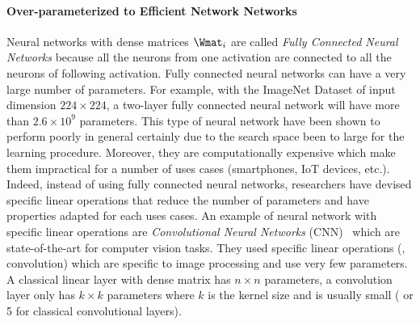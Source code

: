 \paragraph{Over-parameterized to Efficient Network Networks}
Neural networks with dense matrices $\Wmat_i$ are called \emph{Fully Connected Neural Networks} because all the neurons from one activation are connected to all the neurons of following activation.
Fully connected neural networks can have a very large number of parameters.
For example, with the ImageNet Dataset of input dimension $224 \times 224$, a two-layer fully connected neural network will have more than $2.6 \times 10^9$ parameters.
This type of neural network have been shown to perform poorly in general certainly due to the search space been to large for the learning procedure.
Moreover, they are computationally expensive which make them impractical for a number of uses cases (smartphones, IoT devices, etc.).
Indeed, instead of using fully connected neural networks, researchers have devised specific linear operations that reduce the number of parameters and have properties adapted for each uses cases. 
An example of neural network with specific linear operations are \emph{Convolutional Neural Networks} (CNN)~\cite{lecun1998gradient,krizhevsky2012imagenet,he2016deep,tan2019efficientnet} which are state-of-the-art for computer vision tasks. They used specific linear operations (\eg, convolution) which are specific to image processing and use very few parameters.  
A classical linear layer with dense matrix has $n \times n$ parameters, a convolution layer only has $k \times k$ parameters where $k$ is the kernel size and is usually small ( or 5 for classical convolutional layers).


